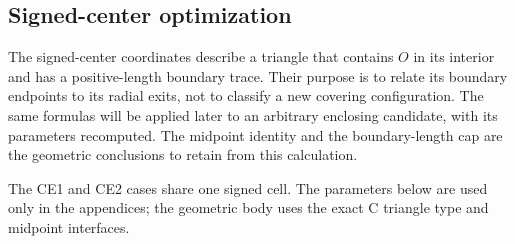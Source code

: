 \subsection{Signed-center optimization}

The signed-center coordinates describe a triangle that contains $O$ in
its interior and has a positive-length boundary trace. Their purpose is to relate its boundary endpoints to
its radial exits, not to classify a new covering configuration. The same
formulas will be applied later to an arbitrary enclosing candidate, with
its parameters recomputed. The midpoint identity and the boundary-length
cap are the geometric conclusions to retain from this calculation.

\label{sec:signed-ce12-reductions}

The CE1 and CE2 cases share one signed cell.  The parameters below are used
only in the appendices; the geometric body uses the exact C triangle type and
midpoint interfaces.


